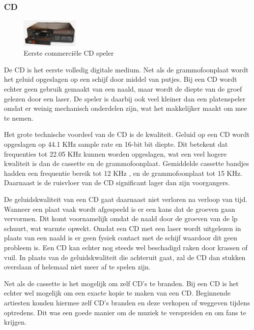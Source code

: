 \subsubsection*{CD}
\begin{figure}
    \centering
    \includegraphics[width=0.25\textwidth]{assets/critical-review/CD-Player.jpeg}
    \caption{Eerste commerciële CD speler}
    \label{fig:critical-review:cp-player}
\end{figure}
De CD is het eerste volledig digitale medium. Net als de grammofoonplaat wordt het geluid opgeslagen op een schijf door middel van putjes. Bij een CD wordt echter geen gebruik gemaakt van een naald, maar wordt de diepte van de groef gelezen door een laser. De speler is daarbij ook veel kleiner dan een platenspeler omdat er weinig mechanisch onderdelen zijn, wat het makkelijker maakt om mee te nemen.

Het grote technische voordeel van de CD is de kwaliteit. Geluid op een CD wordt opgeslagen op 44.1 KHz sample rate en 16-bit bit diepte. Dit betekent dat frequenties tot 22.05 KHz kunnen worden opgeslagen, wat een veel hogere kwaliteit is dan de cassette en de grammofoonplaat. Gemiddelde cassette bandjes hadden een frequentie bereik tot 12 KHz \citep{van1970audio}, en de grammofoonplaat tot 15 KHz. Daarnaast is de ruisvloer van de CD significant lager dan zijn voorgangers.

De geluidskwaliteit van een CD gaat daarnaast niet verloren na verloop van tijd. Wanneer een plaat vaak wordt afgespeeld is er een kans dat de groeven gaan vervormen. Dit komt voornamelijk omdat de naald door de groeven van de lp schuurt, wat warmte opwekt. Omdat een CD met een laser wordt uitgelezen in plaats van een naald is er geen fysiek contact met de schijf waardoor dit geen probleem is. Een CD kan echter nog steeds wel beschadigd raken door krassen of vuil. In plaats van de geluidskwaliteit die achteruit gaat, zal de CD dan stukken overslaan of helemaal niet meer af te spelen zijn.

Net als de cassette is het mogelijk om zelf CD's te branden. Bij een CD is het echter wel mogelijk om een exacte kopie te maken van een CD. Beginnende artiesten konden hiermee zelf CD's branden en deze verkopen of weggeven tijdens optredens. Dit was een goede manier om de muziek te verspreiden en om fans te krijgen.

